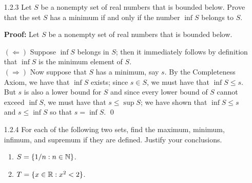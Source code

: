 \begin{enumerate}
      \textbf{Proof:}

      Let $S$ be a nonempty set of integers bounded below. Then there exists
      some $r \in \R$ such that for every $a \in S$, we have that $r \le a$.
      Consider the set $S' = \{-s: s \in S\}$, the set of the additive inverses
      of the elements of $S$. Note that $S'$ is also a nonempty set of integers.
      So let $-d \in S'$ where $d \in S$. Hence $r \le d$, so that $-d \le -r$;
      that is $S'$ is bounded above. By Proposition 1.7 $S'$ has a maximum, say
      $-b$, where $b \in S$. It suffices to show that $b$ is the minimum in $S$.
      Let $c \in S$. Then we have that $-c \le -b$, so that $b \le c$; that is,
      $b$ is the minimum element in $S$. In paritcular, we can see that the
      Well Ordering Principle follows. \qed
   \item[1.2.3]   Let $S$ be a nonempty set of real numbers that is bounded
                  below. Prove that the set $S$ has a minimum if and only if the
                  number $\inf S$ belongs to $S$.
			
		\textbf{Proof:} Let $S$ be a nonempty set of real numbers that is bounded
      below.

      $(\Leftarrow)$ Suppose $\inf S$ belongs in $S$; then it immediately
      follows by definition that $\inf S$ is the minimum element of $S$. \\
      $(\Rightarrow)$ Now suppose that $S$ has a minimum, say $s$. By the
      Completeness Axiom, we have that $\inf S$ exists; since $s \in S$, we must
      have that $\inf S \le s$. But $s$ is also a lower bound for $S$ and since
      every lower bound of $S$ cannot exceed $\inf S$, we must have that
      $s \le \sup S$; we have shown that $\inf S \le s$ and $s \le \inf S$ so
      that $s = \inf S$. \qed
   \item[1.2.4]   For each of the following two sets, find the maximum, minimum,
                  infimum, and supremum if they are defined. Justify your
                  conclusions.
                  \begin{enumerate}
                     \item $S = \{1/n : n \in \mathbb{N}\}$.
                     \item $T = \{x \in \mathbb{R} : x^2 < 2\}$.
                  \end{enumerate}


\end{enumerate}
